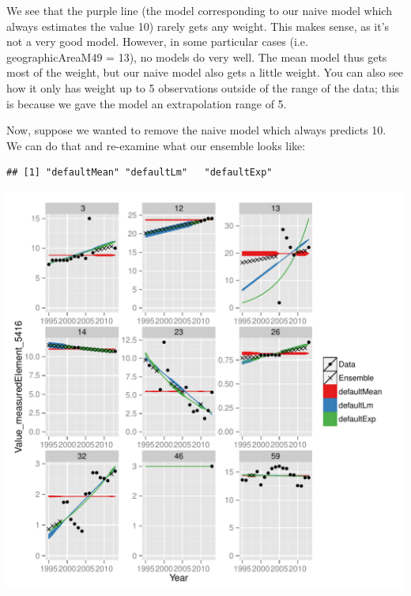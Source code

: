 \documentclass[nojss]{jss}
\begin{document}
We see that the purple line (the model corresponding to our naive model which
always estimates the value 10) rarely gets any weight.  This makes sense, as
it's not a very good model.  However, in some particular cases (i.e.
geographicAreaM49 = 13), no models do very well.  The mean model thus gets most
of the weight, but our naive model also gets a little weight.  You can also see
how it only has weight up to 5 observations outside of the range of the data;
this is because we gave the model an extrapolation range of 5.

Now, suppose we wanted to remove the naive model which always predicts 10.  We
can do that and re-examine what our ensemble looks like:

\begin{knitrout}
\color{fgcolor}\begin{kframe}
\begin{alltt}
\hlopt{$} \hlkwb{=} \hlopt{$}\hlstd{ensembleModels[}\hlopt{-}\hlstd{]}
\hlopt{$}
\end{alltt}
\begin{verbatim}
## [1] "defaultMean" "defaultLm"   "defaultExp"
\end{verbatim}
\begin{alltt}
\hlstd{(}   
\end{alltt}
\end{kframe}

{\centering \includegraphics[width=\maxwidth]{figure/unnamed-chunk-3-1} 

}



\end{knitrout}
\end{document}
